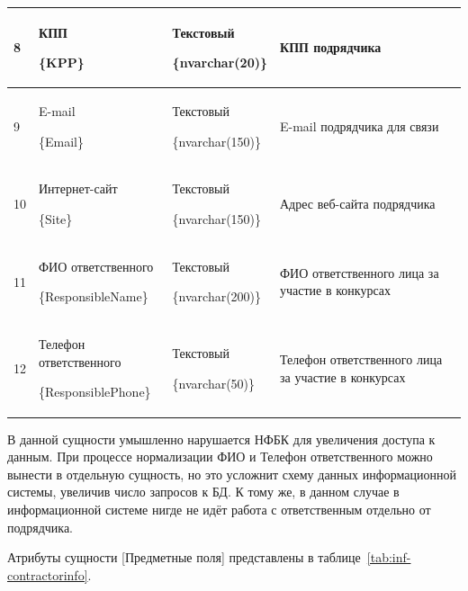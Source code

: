 \begin{footnotesize}
\begin{longtable}[h]{|p{}|p{}|p{}|p{}|}
	8 & КПП \par \{KPP\} & Текстовый \par \{nvarchar(20)\} & КПП подрядчика \\ \hline
	9 & E-mail \par \{Email\} & Текстовый \par \{nvarchar(150)\} & E-mail подрядчика для связи \\ \hline
	10 & Интернет-сайт \par \{Site\} & Текстовый \par \{nvarchar(150)\} & Адрес веб-сайта подрядчика \\ \hline
	11 & ФИО ответственного \par \{ResponsibleName\} & Текстовый \par \{nvarchar(200)\} & ФИО ответственного лица за участие в конкурсах \\ \hline
	12 & Телефон ответственного \par \{ResponsiblePhone\} & Текстовый \par \{nvarchar(50)\} & Телефон ответственного лица за участие в конкурсах \\ \hline
\end{longtable}
\end{footnotesize}

В данной сущности умышленно нарушается НФБК для увеличения доступа к данным.
При процессе нормализации ФИО и Телефон ответственного можно вынести в отдельную сущность, но это усложнит схему данных информационной системы, увеличив число запросов к БД.
К тому же, в данном случае в информационной системе нигде не идёт работа с ответственным отдельно от подрядчика.

Атрибуты сущности [Предметные поля] представлены в таблице~\ref{tab:inf-contractorinfo}.


